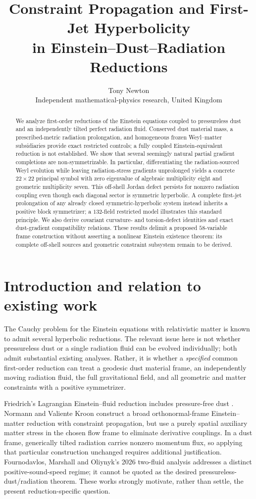 \documentclass[11pt,a4paper]{article}
\title{\bfseries Constraint Propagation and First-Jet Hyperbolicity\\[4pt]
\large in Einstein--Dust--Radiation Reductions}
\author{Tony Newton\\\small Independent mathematical-physics research, United Kingdom}
\date{}
\begin{document}
\maketitle
\begin{abstract}
We analyze first-order reductions of the Einstein equations coupled to pressureless dust and an independently tilted perfect radiation fluid. Conserved dust material mass, a prescribed-metric radiation prolongation, and homogeneous frozen Weyl--matter subsidiaries provide exact restricted controls; a fully coupled Einstein-equivalent reduction is not established. We show that several seemingly natural partial gradient completions are non-symmetrizable. In particular, differentiating the radiation-sourced Weyl evolution while leaving radiation-stress gradients unprolonged yields a concrete $22\times22$ principal symbol with zero eigenvalue of algebraic multiplicity eight and geometric multiplicity seven. This off-shell Jordan defect persists for nonzero radiation coupling even though each diagonal sector is symmetric hyperbolic. A complete first-jet prolongation of any already closed symmetric-hyperbolic system instead inherits a positive block symmetrizer; a $132$-field restricted model illustrates this standard principle. We also derive covariant curvature- and torsion-defect identities and exact dust-gradient compatibility relations. These results delimit a proposed $58$-variable frame construction without asserting a nonlinear Einstein existence theorem: its complete off-shell sources and geometric constraint subsystem remain to be derived.
\end{abstract}

\section{Introduction and relation to existing work}
The Cauchy problem for the Einstein equations with relativistic matter is known to admit several hyperbolic reductions. The relevant issue here is not whether pressureless dust or a single radiation fluid can be evolved individually; both admit substantial existing analyses. Rather, it is whether a \emph{specified} common first-order reduction can treat a geodesic dust material frame, an independently moving radiation fluid, the full gravitational field, and all geometric and matter constraints with a positive symmetrizer.

Friedrich's Lagrangian Einstein--fluid reduction includes pressure-free dust \cite{Friedrich}. Normann and Valiente Kroon \cite{NormannVK} construct a broad orthonormal-frame Einstein--matter reduction with constraint propagation, but use a purely spatial auxiliary matter stress in the chosen flow frame to eliminate derivative couplings. In a dust frame, generically tilted radiation carries nonzero momentum flux, so applying that particular construction unchanged requires additional justification. Fournodavlos, Marshall and Oliynyk's 2026 two-fluid analysis \cite{FMO} addresses a distinct positive-sound-speed regime; it cannot be quoted as the desired pressureless-dust/radiation theorem. These works strongly motivate, rather than settle, the present reduction-specific question.
\end{document}

